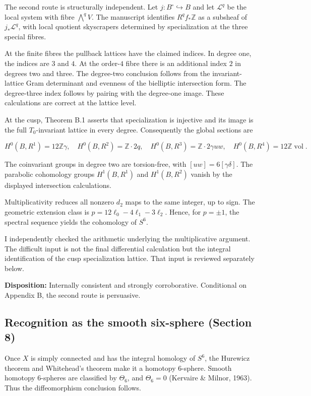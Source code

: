\documentclass[
  10pt,
  letterpaper,
]{article}
\newcommand{\Z}{\mathbb Z}
\begin{document}
The second route is structurally independent. Let
\(j:B^\circ\hookrightarrow B\) and let \(\mathcal L^q\) be the local
system with fibre \(\bigwedge^qV\). The manuscript identifies
\(R^qf_*\Z\) as a subsheaf of \(j_*\mathcal L^q\), with local quotient
skyscrapers determined by specialization at the three special fibres.

At the finite fibres the pullback lattices have the claimed indices. In
degree one, the indices are \(3\) and \(4\). At the order-\(4\) fibre
there is an additional index \(2\) in degrees two and three. The
degree-two conclusion follows from the invariant-lattice Gram
determinant and evenness of the bielliptic intersection form. The
degree-three index follows by pairing with the degree-one image. These
calculations are correct at the lattice level.

At the cusp, Theorem B.1 asserts that specialization is injective and
its image is the full \(T_0\)-invariant lattice in every degree.
Consequently the global sections are

\[
H^0(B,R^1)=12\Z\gamma,
\quad
H^0(B,R^2)=\Z\cdot2q,
\quad
H^0(B,R^3)=\Z\cdot2\gamma uw,
\quad
H^0(B,R^4)=12\Z\operatorname{vol}.
\]

The coinvariant groups in degree two are torsion-free, with
\([uw]=6[\gamma\delta]\). The parabolic cohomology groups \(H^1(B,R^1)\)
and \(H^1(B,R^2)\) vanish by the displayed intersection calculations.

Multiplicativity reduces all nonzero \(d_2\) maps to the same integer,
up to sign. The geometric extension class is
\(p=12\ell_0-4\ell_1-3\ell_2\). Hence, for \(p=\pm1\), the spectral
sequence yields the cohomology of \(S^6\).

I independently checked the arithmetic underlying the multiplicative
argument. The difficult input is not the final differential calculation
but the integral identification of the cusp specialization lattice. That
input is reviewed separately below.

\textbf{Disposition:} Internally consistent and strongly corroborative.
Conditional on Appendix B, the second route is persuasive.

\subsection{Recognition as the smooth six-sphere (Section
8)}\label{recognition-as-the-smooth-six-sphere-section-8}

Once \(X\) is simply connected and has the integral homology of \(S^6\),
the Hurewicz theorem and Whitehead's theorem make it a homotopy
\(6\)-sphere. Smooth homotopy \(6\)-spheres are classified by
\(\Theta_6\), and \(\Theta_6=0\) (Kervaire \& Milnor, 1963). Thus the
diffeomorphism conclusion follows.
\end{document}
